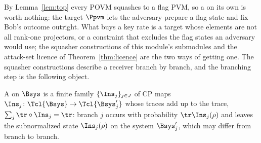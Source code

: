 
By Lemma~\ref{lem:top} every POVM squashes to a flag PVM, so a
 on its own is worth nothing: the target $\Ppvm$
lets the adversary prepare a flag state and fix Bob's outcome outright. What
buys a key rate is a target whose elements are not all rank-one projectors, or
a  constraint that excludes the flag states an adversary would
use; the squasher constructions of this module's submodules and the
attack-set licence of
Theorem~\ref{thm:licence} are the two ways of getting one. The squasher
constructions describe a receiver branch by branch, and the branching step is
the following object.

\begin{definition}\label{def:generalized-instrument}
A  on $\Bsys$ is a finite family
$\{\Ins_j\}_{j\in J}$ of CP maps $\Ins_j\colon\Tcl{\Bsys}\to\Tcl{\Bsys'_j}$
whose traces add up to the trace, $\sum_j\tr\circ\Ins_j=\tr$: branch $j$
occurs with probability $\tr\Ins_j(\rho)$ and leaves the subnormalized state
$\Ins_j(\rho)$ on the system $\Bsys'_j$, which may differ from branch to
branch.
\end{definition}
